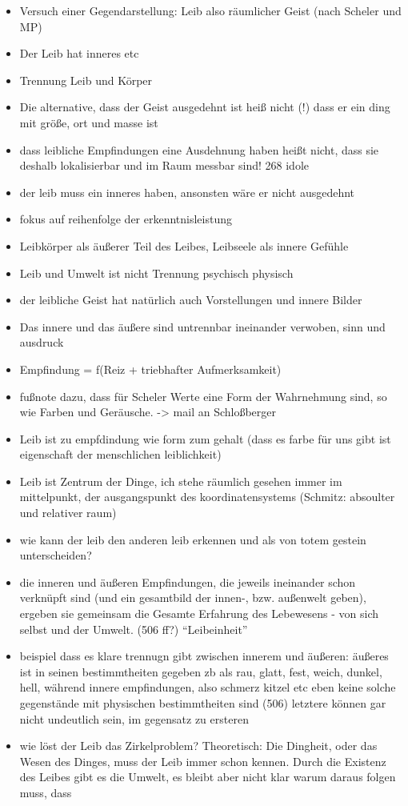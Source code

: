 \documentclass[a4paper, 12pt]{article}
\begin{document}
\begin{onehalfspace}
\begin{itemize}
  \item Versuch einer Gegendarstellung: Leib also räumlicher Geist (nach Scheler und MP)
  \item Der Leib hat inneres etc
  \item Trennung Leib und Körper
  \item Die alternative, dass der Geist ausgedehnt ist heiß nicht (!) dass er ein ding mit größe, ort und masse ist
  \item dass leibliche Empfindungen eine Ausdehnung haben heißt nicht, dass sie deshalb lokalisierbar und im Raum messbar sind! 268 idole
  \item der leib muss ein inneres haben, ansonsten wäre er nicht ausgedehnt
  \item fokus auf reihenfolge der erkenntnisleistung
  \item Leibkörper als äußerer Teil des Leibes, Leibseele als innere Gefühle
  \item Leib und Umwelt ist nicht Trennung psychisch physisch
  \item der leibliche Geist hat natürlich auch Vorstellungen und innere Bilder
  \item Das innere und das äußere sind untrennbar ineinander verwoben, sinn und ausdruck 
  \item Empfindung = f(Reiz + triebhafter Aufmerksamkeit)
  \item fußnote dazu, dass für Scheler Werte eine Form der Wahrnehmung sind, so wie Farben und Geräusche. -> mail an Schloßberger
  \item Leib ist zu empfdindung wie form zum gehalt (dass es farbe für uns gibt ist eigenschaft der menschlichen leiblichkeit)
  \item Leib ist Zentrum der Dinge, ich stehe räumlich gesehen immer im mittelpunkt, der ausgangspunkt des koordinatensystems (Schmitz: absoulter und relativer raum)
  \item wie kann der leib den anderen leib erkennen und als von totem gestein unterscheiden?
  \item die inneren und äußeren Empfindungen, die jeweils ineinander schon verknüpft sind (und ein gesamtbild der innen-, bzw. außenwelt geben), ergeben sie gemeinsam die Gesamte Erfahrung des Lebewesens - von sich selbst und der Umwelt. (506 ff?) "`Leibeinheit"'
  \item beispiel dass es klare trennugn gibt zwischen innerem und äußeren: äußeres ist in seinen bestimmtheiten gegeben zb als rau, glatt, fest, weich, dunkel, hell, während innere empfindungen, also schmerz kitzel etc eben keine solche gegenstände mit physischen bestimmtheiten sind (506) letztere können gar nicht undeutlich sein, im gegensatz zu ersteren
  \item wie löst der Leib das Zirkelproblem? Theoretisch: Die Dingheit, oder das Wesen des Dinges, muss der Leib immer schon kennen. Durch die Existenz des Leibes gibt es die Umwelt, es bleibt aber nicht klar warum daraus folgen muss, dass 
\end{itemize}



\end{onehalfspace}
\end{document}
